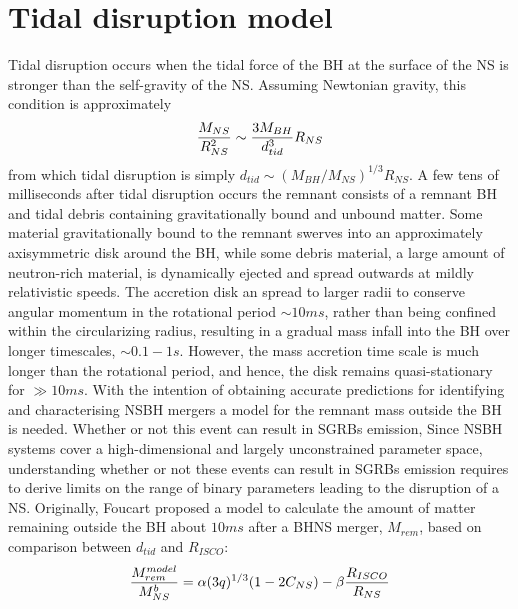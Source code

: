 \documentclass[binding=0.6cm, LaM]{sapthesis}
\begin{document}
\section{Tidal disruption model}
	Tidal disruption occurs when  the  tidal force of the BH at the surface of the NS is stronger
        than the self-gravity of the NS.  Assuming Newtonian gravity, this condition is approximately
                \begin{equation}
                        {{M_{NS}} \over {R_{NS}^2}} \sim {{3M_{BH}} \over {d_{tid}^3}}R_{NS}
                \end{equation}
        from which tidal disruption is simply $d_{tid} \sim (M_{BH}/M_{NS})^{1/3}R_{NS}$.
        A few tens of milliseconds after tidal disruption occurs the remnant consists of
        a remnant BH and tidal debris containing gravitationally bound and unbound matter.
        Some material gravitationally bound to the remnant swerves
        into an approximately axisymmetric disk around the BH, while some debris material,
        a large amount of neutron-rich material, is dynamically ejected and spread outwards at mildly relativistic speeds.
        The accretion disk an spread to larger radii to conserve angular momentum in the rotational period $\sim 10 ms$,
        rather than being confined within the circularizing radius, resulting in a gradual mass infall into the BH over longer timescales, $\sim 0.1-1 s$.
        However, the mass accretion time scale is much longer than the rotational period, and hence, the disk remains quasi-stationary for $\gg 10 ms$.
        With the intention of obtaining accurate predictions for identifying and characterising NSBH mergers
        a model for the remnant mass outside the BH is needed.
        Whether or not this event can result in SGRBs emission,
        Since NSBH systems cover a high-dimensional and largely unconstrained parameter space,
        understanding whether or not these events can result in SGRBs emission requires to
        derive limits on the range of binary parameters leading to the disruption of a NS.
        Originally, Foucart proposed a model to calculate the amount of matter remaining
        outside the BH about $10ms$ after a BHNS merger, $M_{rem}$, based on comparison
        between $d_{tid}$ and $R_{ISCO}$:
                \begin{equation}
                \label{eq:mrem}
		        {{M_{rem}^{model}} \over {M^b_{NS}}} = \alpha(3q)^{1/3}(1 - 2C_{NS}) - \beta{{R_{ISCO}} \over {R_{NS}}}
                \end{equation}
\end{document}
